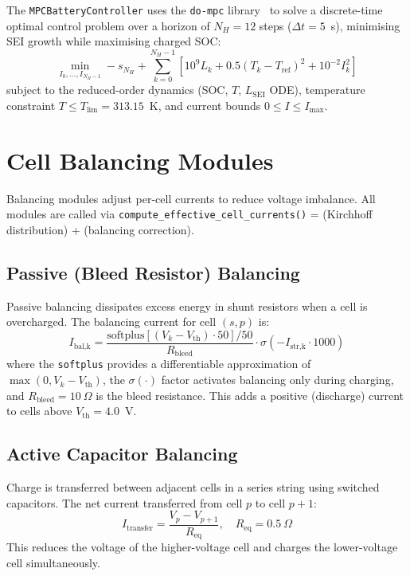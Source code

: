 The \texttt{MPCBatteryController} uses the \texttt{do-mpc} library~\cite{Frison2020} to solve a discrete-time optimal control problem over a horizon of $N_H = 12$ steps ($\Delta t = 5$~s), minimising SEI growth while maximising charged SOC:
\begin{equation}
  \min_{I_0,\ldots,I_{N_H-1}} -s_{N_H} + \sum_{k=0}^{N_H-1}\left[10^9 L_{k} + 0.5(T_k - T_\text{ref})^2 + 10^{-2} I_k^2\right]
  \label{eq:mpc_cost}
\end{equation}
subject to the reduced-order dynamics (SOC, $T$, $L_\text{SEI}$ ODE), temperature constraint $T \leq T_\text{lim} = 313.15$~K, and current bounds $0 \leq I \leq I_\text{max}$.

\section{Cell Balancing Modules}
\label{sec:balancing}

Balancing modules adjust per-cell currents to reduce voltage imbalance. All modules are called via \texttt{compute\_effective\_cell\_currents()} = (Kirchhoff distribution) + (balancing correction).

\subsection{Passive (Bleed Resistor) Balancing}

Passive balancing dissipates excess energy in shunt resistors when a cell is overcharged. The balancing current for cell $(s,p)$ is:
\begin{equation}
  I_\text{bal,k} = \frac{\text{softplus}[(V_k - V_\text{th}) \cdot 50]/50}{R_\text{bleed}} \cdot \sigma(-I_\text{str,k} \cdot 1000)
  \label{eq:passive_bal}
\end{equation}
where the \texttt{softplus} provides a differentiable approximation of $\max(0, V_k - V_\text{th})$, the $\sigma(\cdot)$ factor activates balancing only during charging, and $R_\text{bleed} = 10~\Omega$ is the bleed resistance. This adds a positive (discharge) current to cells above $V_\text{th} = 4.0$~V.

\subsection{Active Capacitor Balancing}

Charge is transferred between adjacent cells in a series string using switched capacitors. The net current transferred from cell $p$ to cell $p+1$:
\begin{equation}
  I_\text{transfer} = \frac{V_p - V_{p+1}}{R_\text{eq}}, \quad R_\text{eq} = 0.5~\Omega
  \label{eq:active_cap_bal}
\end{equation}
This reduces the voltage of the higher-voltage cell and charges the lower-voltage cell simultaneously.

